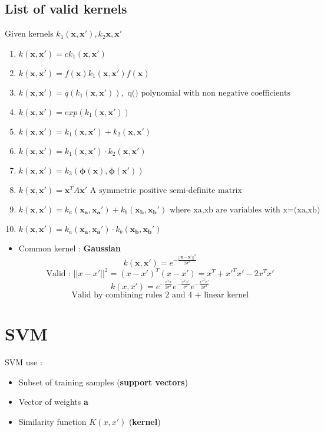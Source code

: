 \documentclass[12pt]{article} %
\begin{document}
\subsection{List of valid kernels}
Given kernels $k_1(\bm{x,x'}), k_2{\bm{x,x'}}$
\begin{enumerate}
\item $k(\bm{x,x'}) = ck_1(\bm{x,x'})$
\item $k(\bm{x,x'}) = f(\bm{x})k_1(\bm{x,x'})f(\bm{x})$
\item $k(\bm{x,x'}) = q(k_1(\bm{x,x'})), \text{ q() polynomial with non negative coefficients}$
\item $k(\bm{x,x'}) = exp(k_1(\bm{x,x'}))$
\item $k(\bm{x,x'}) = k_1(\bm{x,x'}) +  k_2(\bm{x,x'})$
\item $k(\bm{x,x'}) = k_1(\bm{x,x'}) \cdot k_2(\bm{x,x'})$
\item $k(\bm{x,x'}) = k_3(\bm{\phi(x),\phi(x')})$
\item $k(\bm{x,x'}) = \bm{x}^TA\bm{x'} \text{ A symmetric positive semi-definite matrix}$
\item $k(\bm{x,x'}) = k_a(\bm{x_a,x_a'}) +  k_b(\bm{x_b,x_b'}) \text{ where xa,xb are variables with x=(xa,xb)}$
\item $k(\bm{x,x'}) = k_a(\bm{x_a,x_a'}) \cdot k_b(\bm{x_b,x_b'}) $
\end{enumerate}

\begin{itemize}
\item Common kernel : \textbf{Gaussian}
$$ k(\bm{x,x'}) = e^{-\frac{||\bm{x-x'}||^2}{2\sigma^2}}$$
$$ \text{Valid : } ||x-x'||^2= (x-x')^T(x-x')=x^T + x'^Tx' - 2x^Tx'$$
$$ k(x,x') = e^{-\frac{x^Tx}{2\sigma^2}}e^{-\frac{x^Tx'}{\sigma^2}}e^{-\frac{x'^Tx'}{2\sigma^2}}$$
$$ \text{Valid by combining rules 2 and 4 + linear kernel}$$
\end{itemize}


\section{SVM}
SVM use :
\begin{itemize}
\item Subset of training samples (\textbf{support vectors})
\item Vector of weights \textbf{a}
\item Similarity function $K(x,x')$ (\textbf{kernel})
\end{itemize}
\end{document}
